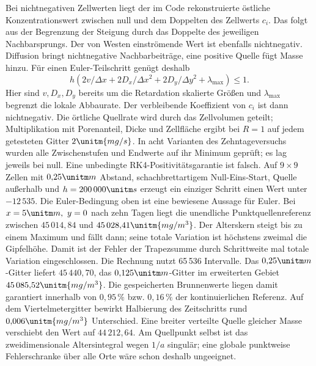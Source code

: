 Bei nichtnegativen Zellwerten liegt der im Code rekonstruierte östliche Konzentrationswert zwischen null und dem Doppelten des Zellwerts \(c_i\). Das folgt aus der Begrenzung der Steigung durch das Doppelte des jeweiligen Nachbarsprungs. Der von Westen einströmende Wert ist ebenfalls nichtnegativ. Diffusion bringt nichtnegative Nachbarbeiträge, eine positive Quelle fügt Masse hinzu. Für einen Euler-Teilschritt genügt deshalb
\[
 h\left(2v/\Delta x+2D_x/\Delta x^2+2D_y/\Delta y^2+
 \lambda_{\max}\right)\le 1 .
\]
Hier sind \(v,D_x,D_y\) bereits um die Retardation skalierte Größen und \(\lambda_{\max}\) begrenzt die lokale Abbaurate. Der verbleibende Koeffizient von \(c_i\) ist dann nichtnegativ. Die örtliche Quellrate wird durch das Zellvolumen geteilt; Multiplikation mit Porenanteil, Dicke und Zellfläche ergibt bei \(R=1\) auf jedem getesteten Gitter \(2\unitm{mg/s}\).
In acht Varianten des Zehntageversuchs wurden alle Zwischenstufen und Endwerte auf ihr Minimum geprüft; es lag jeweils bei null. Eine unbedingte RK4-Positivitätsgarantie ist falsch. Auf \(9\times9\) Zellen mit \(0{,}25\unitm m\) Abstand, schachbrettartigem Null-Eins-Start, Quelle außerhalb und \(h=200\,000\unitm s\) erzeugt ein einziger Schritt einen Wert unter \(-12\,535\). Die Euler-Bedingung oben ist eine bewiesene Aussage für Euler.
Bei \(x=5\unitm m,\ y=0\) nach zehn Tagen liegt die unendliche Punktquellenreferenz zwischen \(45\,014{,}84\) und \(45\,028{,}41\unitm{mg/m^3}\). Der Alterskern steigt bis zu einem Maximum und fällt dann; seine totale Variation ist höchstens zweimal die Gipfelhöhe. Damit ist der Fehler der Trapezsumme durch Schrittweite mal totale Variation eingeschlossen. Die Rechnung nutzt 65\,536 Intervalle.
Das \(0{,}25\unitm m\)-Gitter liefert \(45\,440{,}70\), das \(0{,}125\unitm m\)-Gitter im erweiterten Gebiet \(45\,085{,}52\unitm{mg/m^3}\). Die gespeicherten Brunnenwerte liegen damit garantiert innerhalb von \(0{,}95\,\%\) bzw. \(0{,}16\,\%\) der kontinuierlichen Referenz. Auf dem Viertelmetergitter bewirkt Halbierung des Zeitschritts rund \(0{,}006\unitm{mg/m^3}\) Unterschied. Eine breiter verteilte Quelle gleicher Masse verschiebt den Wert auf \(44\,212{,}64\). Am Quellpunkt selbst ist das zweidimensionale Altersintegral wegen \(1/a\) singulär; eine globale punktweise Fehlerschranke über alle Orte wäre schon deshalb ungeeignet.

